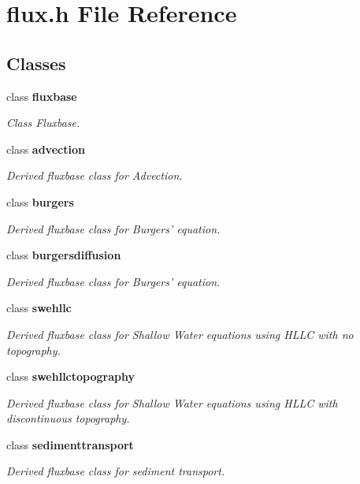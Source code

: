\section{flux.\-h File Reference}
\label{flux_8h}
\subsection*{Classes}
\begin{DoxyCompactItemize}
\item 
class {\bf fluxbase}
\begin{DoxyCompactList}\small\item\em Class Fluxbase. \end{DoxyCompactList}\item 
class {\bf advection}
\begin{DoxyCompactList}\small\item\em Derived fluxbase class for Advection. \end{DoxyCompactList}\item 
class {\bf burgers}
\begin{DoxyCompactList}\small\item\em Derived fluxbase class for Burgers' equation. \end{DoxyCompactList}\item 
class {\bf burgersdiffusion}
\begin{DoxyCompactList}\small\item\em Derived fluxbase class for Burgers' equation. \end{DoxyCompactList}\item 
class {\bf swehllc}
\begin{DoxyCompactList}\small\item\em Derived fluxbase class for Shallow Water equations using H\-L\-L\-C with no topography. \end{DoxyCompactList}\item 
class {\bf swehllctopography}
\begin{DoxyCompactList}\small\item\em Derived fluxbase class for Shallow Water equations using H\-L\-L\-C with discontinuous topography. \end{DoxyCompactList}\item 
class {\bf sedimenttransport}
\begin{DoxyCompactList}\small\item\em Derived fluxbase class for sediment transport. \end{DoxyCompactList}\item 

\end{DoxyCompactItemize}
